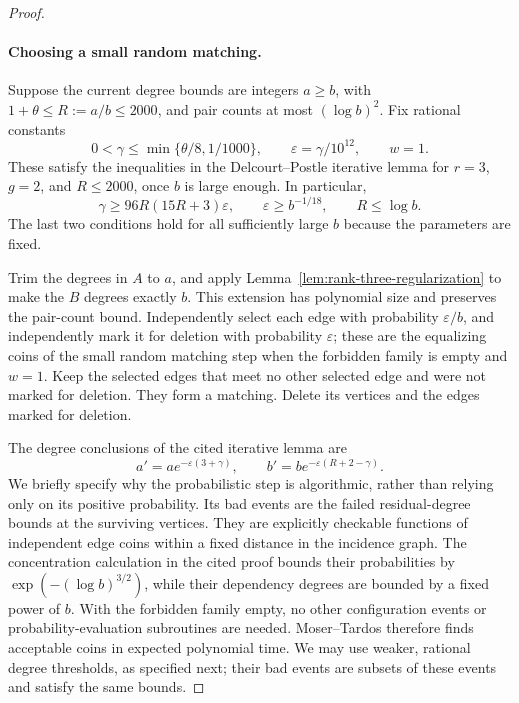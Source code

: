 \documentclass[11pt]{article}
\theoremstyle{definition}\newtheorem{algorithm}{Algorithm}[section]
\numberwithin{equation}{section}
\theoremstyle{remark}\newtheorem*{remark}{Remark}
\begin{document}
\begin{proof}
\paragraph{Choosing a small random matching.}
Suppose the current degree bounds are integers $a\ge b$, with
$1+\theta\le R:=a/b\le2000$, and pair counts at most
$(\log b)^2$. Fix rational constants
\[
 0<\gamma\le\min\{\theta/8,1/1000\},\qquad
 \varepsilon=\gamma/10^{12},\qquad w=1.
\]
These satisfy the inequalities in the Delcourt--Postle iterative
lemma for $r=3$, $g=2$, and $R\le2000$, once $b$ is large enough.
In particular,
\[
 \gamma\ge 96R(15R+3)\varepsilon,
 \qquad \varepsilon\ge b^{-1/18},\qquad R\le\log b.
\]
The last two conditions hold for all sufficiently large $b$ because
the parameters are fixed.

Trim the degrees in $A$ to $a$, and apply
Lemma~\ref{lem:rank-three-regularization} to make the $B$ degrees
exactly $b$. This extension has polynomial size and preserves the
pair-count bound. Independently select each edge with probability
$\varepsilon/b$, and independently mark it for deletion with probability
$\varepsilon$; these are the equalizing coins of the small random matching step when the
forbidden family is empty and $w=1$. Keep the selected edges that
meet no other selected edge and were not marked for deletion. They
form a matching. Delete its vertices and the edges marked for deletion.

The degree conclusions of the cited iterative lemma are
\[
 a'=a e^{-\varepsilon(3+\gamma)},\qquad
 b'=b e^{-\varepsilon(R+2-\gamma)}.
\]
We briefly specify why the probabilistic step is algorithmic, rather
than relying only on its positive probability. Its bad events are
the failed residual-degree bounds at the surviving vertices.
They are explicitly checkable functions of independent edge coins
within a fixed distance in the incidence graph. The concentration
calculation in the cited proof bounds their probabilities by
$\exp(- (\log b)^{3/2})$, while their dependency degrees are bounded
by a fixed power of $b$. With the forbidden family empty, no other
configuration events or probability-evaluation subroutines are needed.
Moser--Tardos therefore finds acceptable coins in expected polynomial
time. We may use weaker, rational degree thresholds, as specified next;
their bad events are subsets of these events and satisfy the same bounds.


\end{proof}
\end{document}
